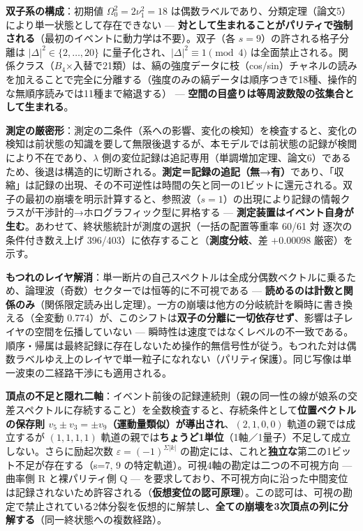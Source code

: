 \documentclass[
]{ltjsarticle}
\begin{document}
\textbf{双子系の構成}：初期値 \(\Omega_0^2=2\nu_1^2=18\)
は偶数ラベルであり、分類定理（論文5）により単一状態として存在できない
---
\textbf{対として生まれることがパリティで強制される}（最初のイベントに動力学は不要）。双子（各
\(s=9\)）の許される格子分離は \(|\Delta|^2\in\{2,\ldots,20\}\)
に量子化され、\(|\Delta|^2\equiv1\pmod4\)
は全面禁止される。関係クラス（\(B_4\)×入替で21類）は、縞の強度データに枝（cos/sin）チャネルの読みを加えることで完全に分離する（強度のみの縞データは順序つきで18種、操作的な無順序読みでは11種まで縮退する）
--- \textbf{空間の目盛りは等周波数殻の弦集合として生まれる}。

\textbf{測定の厳密形}：測定の二条件（系への影響、変化の検知）を検査すると、変化の検知は前状態の知識を要して無限後退するが、本モデルでは前状態の記録が検閲により不在であり、\(\lambda\)
側の変位記録は追記専用（単調増加定理、論文6）であるため、後退は構造的に切断される。\textbf{測定＝記録の追記（無→有）}であり、「収縮」は記録の出現、その不可逆性は時間の矢と同一の1ビットに還元される。双子の最初の崩壊を明示計算すると、参照波（\(s=1\)）の出現により記録の情報クラスが干渉計的→ホログラフィック型に昇格する
---
\textbf{測定装置はイベント自身が生む}。あわせて、終状態統計が測度の選択（一括の配置等重率
60/61 対 逐次の条件付き数え上げ
396/403）に依存すること（\textbf{測度分岐}、差 \(+0.00098\)
厳密）を示す。

\textbf{もつれのレイヤ解消}：単一断片の自己スペクトルは全成分偶数ベクトルに乗るため、論理波（奇数）セクターでは恒等的に不可視である
---
\textbf{読めるのは計数と関係のみ}（関係限定読み出し定理）。一方の崩壊は他方の分岐統計を瞬時に書き換える（全変動
0.774）が、このシフトは\textbf{双子の分離に一切依存せず}、影響は子レイヤの空間を伝播していない
---
瞬時性は速度ではなくレベルの不一致である。順序・帰属は最終記録に存在しないため操作的無信号性が従う。もつれた対は偶数ラベルゆえ上のレイヤで単一粒子になれない（パリティ保護）。同じ写像は単一波束の二経路干渉にも適用される。

\textbf{頂点の不足と隠れ二軸}：イベント前後の記録連続則（親の同一性の線が娘系の交差スペクトルに存続すること）を全数検査すると、存続条件として\textbf{位置ベクトルの保存則
\(v_5\pm v_3=\pm v_9\)（運動量類似）が導出され}、\((2,1,0,0)\)
軌道の親では成立するが \((1,1,1,1)\)
軌道の親では\textbf{ちょうど1単位}（1軸／1量子）不足して成立しない。さらに励起次数
\(\varepsilon=(-1)^{\Sigma|k|}\)
の勘定には、これと\textbf{独立な}第二の1ビット不足が存在する（s=7, 9
の特定軌道）。可視4軸の勘定は二つの不可視方向 --- 曲率側 R
と裸パリティ側 Q ---
を要求しており、不可視方向に沿った中間変位は記録されないため許容される（\textbf{仮想変位の認可原理}）。この認可は、可視の勘定で禁止されている2体分裂を仮想的に解禁し、\textbf{全ての崩壊を3次頂点の列に分解する}（同一終状態への複数経路）。
\end{document}
